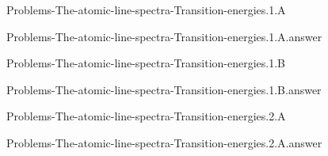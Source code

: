\documentclass[main.tex]{subfiles}
\newcommand\chapterlabel{}
\begin{document}
\renewcommand\chapterlabel{Ch-radiation}
\begin{question}[ID=\the\value{numA}]
{Problems-The-atomic-line-spectra-Transition-energies.1.A}
\end{question}
   \begin{Form}
   \TextField[multiline,backgroundcolor=gray!20,borderwidth=0,width=0.43\textwidth  ,height=115pt, name=\the\value{numA}]  { }\end{Form}
\begin{solution}
{Problems-The-atomic-line-spectra-Transition-energies.1.A.answer}
\hspace{0.1cm}
\end{solution}


\renewcommand\chapterlabel{Ch-radiation}
\begin{question}[ID=\the\value{numA}]
{Problems-The-atomic-line-spectra-Transition-energies.1.B}
\end{question}
   \begin{Form}
   \TextField[multiline,backgroundcolor=gray!20,borderwidth=0,width=0.43\textwidth  ,height=115pt, name=\the\value{numA}]  { }\end{Form}
\begin{solution}
{Problems-The-atomic-line-spectra-Transition-energies.1.B.answer}
\hspace{0.1cm}
\end{solution}


\renewcommand\chapterlabel{Ch-radiation}
\begin{question}[ID=\the\value{numA}]
{Problems-The-atomic-line-spectra-Transition-energies.2.A}
\end{question}
   \begin{Form}
   \TextField[multiline,backgroundcolor=gray!20,borderwidth=0,width=0.43\textwidth  ,height=115pt, name=\the\value{numA}]  { }\end{Form}
\begin{solution}
{Problems-The-atomic-line-spectra-Transition-energies.2.A.answer}
\hspace{0.1cm}
\end{solution}
\end{document}
